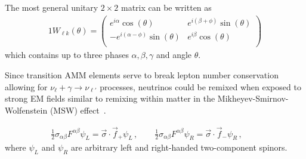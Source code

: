 The most general unitary $2\times2$ matrix can be written as
\begin{alignat}{1}
	\label{mix:4} W_{\ell k}(\theta) = 
    \left(
    \begin{array}{cc}
         e^{i \alpha } \cos (\theta ) & e^{i (\beta +\phi )} \sin (\theta ) \\
         -e^{i (\alpha -\phi )} \sin (\theta ) & e^{i \beta } \cos (\theta ) \\
    \end{array}
    \right)
\end{alignat}
which contains up to three phases $\alpha,\beta,\gamma$ and angle $\theta$.

Since transition AMM elements serve to break lepton number conservation allowing for $\nu_{\ell}+\gamma\rightarrow\nu_{\ell'}$ processes, neutrinos could be remixed when exposed to strong EM fields similar to remixing within matter in the Mikheyev-Smirnov-Wolfenstein (MSW) effect~\citep{Wolfenstein:1977ue,Mikheyev:1985zog}.
    
 \begin{align}
    \label{chiral:1b}
   \frac{1}{2}\sigma_{\alpha\beta}F^{\alpha\beta}\psi_{L} = \vec{\sigma}\cdot\vec{f}_{+}\psi_{L}\,,\qquad
    \frac{1}{2}\sigma_{\alpha\beta}F^{\alpha\beta}\psi_{R} = \vec{\sigma}\cdot\vec{f}_{-}\psi_{R}\,,\qquad
\end{align}
where $\psi_{L}$ and $\psi_{R}$ are arbitrary left and right-handed two-component spinors.

